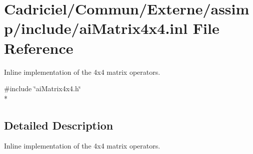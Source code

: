 \hypertarget{ai_matrix4x4_8inl}{\section{Cadriciel/\-Commun/\-Externe/assimp/include/ai\-Matrix4x4.inl File Reference}
\label{ai_matrix4x4_8inl}
}


Inline implementation of the 4x4 matrix operators.  


{\ttfamily \#include \char`\"{}ai\-Matrix4x4.\-h\char`\"{}}\\*


\subsection{Detailed Description}
Inline implementation of the 4x4 matrix operators. 